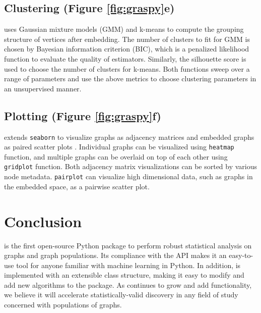 \subsection{Clustering (Figure \ref{fig:graspy}e)}
\graspy uses Gaussian mixture models (GMM) and k-means to compute the grouping structure of vertices after embedding. The number of clusters to fit for GMM is chosen by Bayesian information criterion (BIC), which is a penalized likelihood function to evaluate the quality of estimators. Similarly, the silhouette score is used to choose the number of clusters for k-means. Both functions sweep over a range of parameters and use the above metrics to choose clustering parameters in an unsupervised manner. 

\subsection{Plotting (Figure \ref{fig:graspy}f)}
\graspy extends \texttt{seaborn} to visualize graphs as adjacency matrices and embedded graphs as paired scatter plots \citep{seaborn}. Individual graphs can be visualized using \texttt{heatmap} function, and multiple graphs can be overlaid on top of each other using \texttt{gridplot} function. Both adjacency matrix visualizations can be sorted by various node metadata. \texttt{pairplot} can visualize high dimensional data, such as graphs in the embedded space, as a pairwise scatter plot.

\section{Conclusion}
\graspy is the first open-source Python package to perform robust statistical analysis on graphs and graph populations. Its compliance with the \sklearn API makes it an easy-to-use tool for anyone familiar with machine learning in Python. In addition, \graspy is implemented with an extensible class structure, making it easy to modify and add new algorithms to the package. As \graspy continues to grow and add functionality, we believe it will accelerate statistically-valid discovery in any field of study concerned with populations of graphs. 